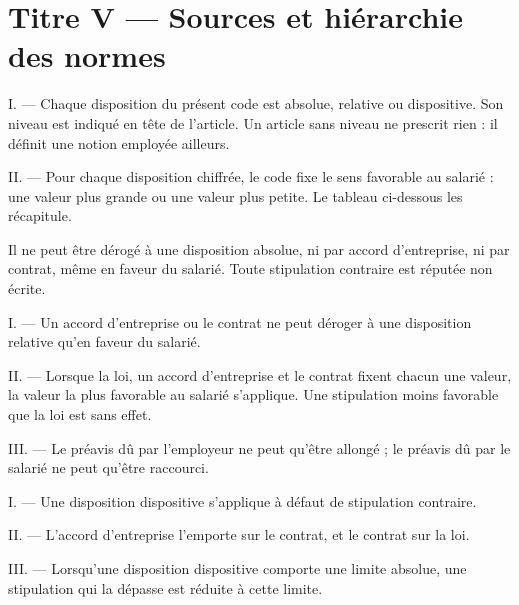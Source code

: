 \setcounter{section}{4}
\section{Titre V --- Sources et hiérarchie des normes}

\label{art:niveaux}
I. --- Chaque disposition du présent code est absolue, relative ou
dispositive. Son niveau est indiqué en tête de l'article. Un article sans
niveau ne prescrit rien : il définit une notion employée ailleurs.

II. --- Pour chaque disposition chiffrée, le code fixe le sens favorable au
salarié : une valeur plus grande ou une valeur plus petite. Le tableau
ci-dessous les récapitule.

\label{art:absolues}
Il ne peut être dérogé à une disposition absolue, ni par accord d'entreprise,
ni par contrat, même en faveur du salarié. Toute stipulation contraire est
réputée non écrite.

\label{art:relatives}
I. --- Un accord d'entreprise ou le contrat ne peut déroger à une disposition
relative qu'en faveur du salarié.

II. --- Lorsque la loi, un accord d'entreprise et le contrat fixent chacun une
valeur, la valeur la plus favorable au salarié s'applique. Une stipulation
moins favorable que la loi est sans effet.

III. --- Le préavis dû par l'employeur ne peut qu'être allongé ; le préavis dû
par le salarié ne peut qu'être raccourci.

\label{art:dispositives}
I. --- Une disposition dispositive s'applique à défaut de stipulation
contraire.

II. --- L'accord d'entreprise l'emporte sur le contrat, et le contrat sur la
loi.

III. --- Lorsqu'une disposition dispositive comporte une limite absolue, une
stipulation qui la dépasse est réduite à cette limite.


